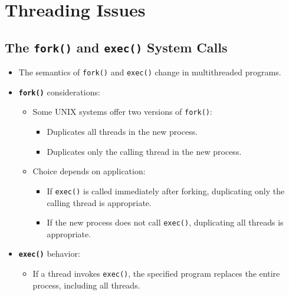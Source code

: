 \section{Threading Issues}\label{sec:4.6}

\subsection{The \texttt{fork()} and \texttt{exec()} System Calls}
\begin{itemize}
    \item The semantics of \texttt{fork()} and \texttt{exec()} change in multithreaded programs.
    \item \textbf{\texttt{fork()}} considerations:
        \begin{itemize}
            \item Some UNIX systems offer two versions of \texttt{fork()}:
                \begin{itemize}
                    \item Duplicates all threads in the new process.
                    \item Duplicates only the calling thread in the new process.
                \end{itemize}
            \item Choice depends on application:
                \begin{itemize}
                    \item If \texttt{exec()} is called immediately after forking, duplicating only the calling thread is appropriate.
                    \item If the new process does not call \texttt{exec()}, duplicating all threads is appropriate.
                \end{itemize}
        \end{itemize}
    \item \textbf{\texttt{exec()}} behavior:
        \begin{itemize}
            \item If a thread invokes \texttt{exec()}, the specified program replaces the entire process, including all threads.
        \end{itemize}
\end{itemize}

